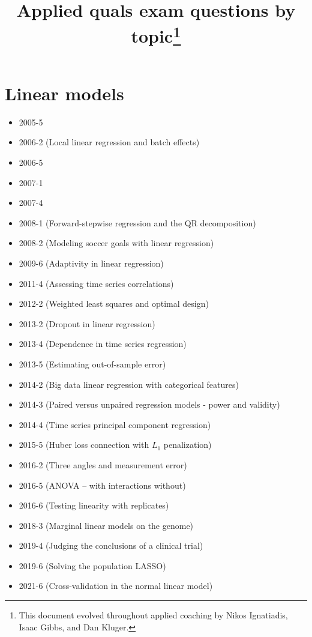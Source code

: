 \documentclass[12pt]{article}
\title{Applied quals exam questions by topic\footnote{This document evolved throughout applied coaching by Nikos Ignatiadis, Isaac Gibbs, and Dan Kluger.}}
\begin{document}
\maketitle
\section*{Linear models}
\begin{itemize}
\item 2005-5
\item 2006-2 (Local linear regression and batch effects)
\item 2006-5
\item 2007-1
\item 2007-4
\item 2008-1 (Forward-stepwise regression and the QR decomposition)
\item 2008-2 (Modeling soccer goals with linear regression)
\item 2009-6 (Adaptivity in linear regression)
\item 2011-4 (Assessing time series correlations)
\item 2012-2 (Weighted least squares and optimal design)
\item 2013-2 (Dropout in linear regression)
\item 2013-4 (Dependence in time series regression)
\item 2013-5 (Estimating out-of-sample error)
\item 2014-2 (Big data linear regression with categorical features)
\item 2014-3 (Paired versus unpaired regression models - power and validity)
\item 2014-4 (Time series principal component regression)
\item 2015-5 (Huber loss connection with $L_1$ penalization)
\item 2016-2 (Three angles and measurement error)
\item 2016-5 (ANOVA -- with interactions without)
\item 2016-6 (Testing linearity with replicates)
\item 2018-3 (Marginal linear models on the genome)
\item 2019-4 (Judging the conclusions of a clinical trial)
\item 2019-6 (Solving the population LASSO)
\item 2021-6 (Cross-validation in the normal linear model)
\end{itemize}
\end{document}
